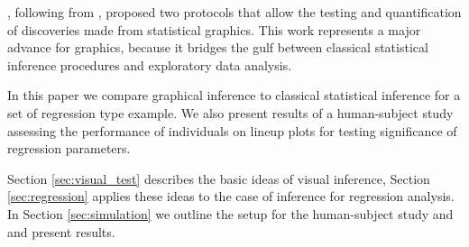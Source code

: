 \documentclass{article}
\begin{document}
\citet{buja:2009}, following from \cite{gelman:2004}, proposed two protocols that allow the testing and quantification of discoveries made from statistical graphics. This work represents a major advance for graphics, because it bridges the gulf between classical statistical inference procedures and exploratory data analysis.

In this paper we compare graphical inference to classical statistical inference for a set of regression type example. We also present results of a human-subject study assessing the performance of individuals on lineup plots \citep{buja:2009} for testing significance of regression parameters. 

Section \ref{sec:visual_test} describes the basic ideas of visual inference, Section \ref{sec:regression} applies these ideas to the case of inference for regression analysis. In Section \ref{sec:simulation} we outline the setup for the human-subject study and  and present results. 

\end{document}
